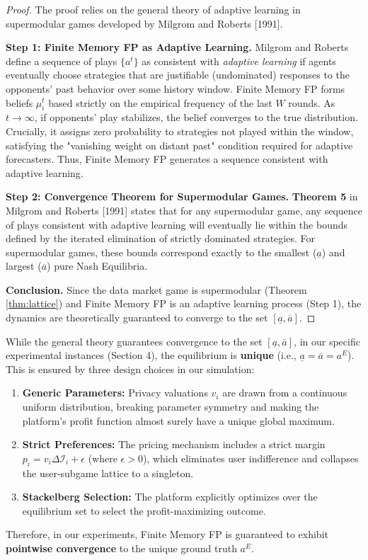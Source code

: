 \documentclass[lettersize,journal]{IEEEtran}
\begin{document}
\begin{proof}
The proof relies on the general theory of adaptive learning in supermodular games developed by Milgrom and Roberts [1991].

\textbf{Step 1: Finite Memory FP as Adaptive Learning.}
Milgrom and Roberts define a sequence of plays $\{a^t\}$ as consistent with \textit{adaptive learning} if agents eventually choose strategies that are justifiable (undominated) responses to the opponents' past behavior over some history window. 
Finite Memory FP forms beliefs $\mu_i^t$ based strictly on the empirical frequency of the last $W$ rounds. As $t \to \infty$, if opponents' play stabilizes, the belief converges to the true distribution. Crucially, it assigns zero probability to strategies not played within the window, satisfying the "vanishing weight on distant past" condition required for adaptive forecasters. Thus, Finite Memory FP generates a sequence consistent with adaptive learning.

\textbf{Step 2: Convergence Theorem for Supermodular Games.}
\textbf{Theorem 5} in Milgrom and Roberts [1991] states that for any supermodular game, any sequence of plays consistent with adaptive learning will eventually lie within the bounds defined by the iterated elimination of strictly dominated strategies. For supermodular games, these bounds correspond exactly to the smallest ($\underline{a}$) and largest ($\overline{a}$) pure Nash Equilibria.

\textbf{Conclusion.}
Since the data market game is supermodular (Theorem \ref{thm:lattice}) and Finite Memory FP is an adaptive learning process (Step 1), the dynamics are theoretically guaranteed to converge to the set $[\underline{a}, \overline{a}]$.
\end{proof}

\begin{remark}
While the general theory guarantees convergence to the set $[\underline{a}, \overline{a}]$, in our specific experimental instances (Section 4), the equilibrium is \textbf{unique} (i.e., $\underline{a} = \overline{a} = a^E$). This is ensured by three design choices in our simulation:
\begin{enumerate}
    \item \textbf{Generic Parameters:} Privacy valuations $v_i$ are drawn from a continuous uniform distribution, breaking parameter symmetry and making the platform's profit function almost surely have a unique global maximum.
    \item \textbf{Strict Preferences:} The pricing mechanism includes a strict margin $p_i = v_i \Delta \mathcal{I}_i + \epsilon$ (where $\epsilon > 0$), which eliminates user indifference and collapses the user-subgame lattice to a singleton.
    \item \textbf{Stackelberg Selection:} The platform explicitly optimizes over the equilibrium set to select the profit-maximizing outcome.
\end{enumerate}
Therefore, in our experiments, Finite Memory FP is guaranteed to exhibit \textbf{pointwise convergence} to the unique ground truth $a^E$.
\end{remark}
\end{document}
